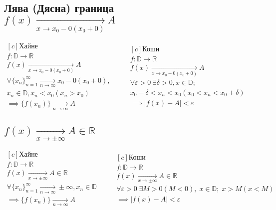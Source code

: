 \documentclass{article}
\newcommand{\pto}[2]{\xrightarrow[#1 \to #2]{}}
\newcommand{\xto}[1]{\pto{x}{#1}}
\newcommand{\nto}[0]{\pto{n}{\infty}}
\newcommand{\R}[0]{\mathbb{R}}
\newcommand{\D}[0]{\mathbb{D}}
\newcommand{\spc}[0]{\quad}
\newcommand{\e}[0]{\varepsilon}
\newcommand{\seq}[1]{\{#1_n\}_{n=1}^{\infty}}
\begin{document}
    \subsection{Лява (Дясна) граница \\ \(f(x) \xto{x_0 - 0 (x_0 + 0)} A\)}
    \(
        \begin{aligned}[c]
        \text{Хайне}\\
        f: \D \to \R\\
        f(x) \xto{x_0 - 0 (x_0 + 0)} A\\
        \forall \seq{x} \nto x_0 - 0 (x_0 + 0),\\
        x_n \in \D, x_n < x_0 (x_n > x_0)\\
        \implies \{f(x_n)\} \nto A 
        \end{aligned}
        \spc\spc
        \begin{aligned}[c]
         \text{Коши}\\
        f: \D \to \R\\
        f(x) \xto{x_0 - 0 (x_0 + 0)} A\\
        \forall \e > 0 \; \exists \delta > 0, x \in \D;\\
        x_0 - \delta < x_n < x_0 (x_0 < x_n < x_0 + \delta)\\
        \implies |f(x) - A| < \e
        \end{aligned}
    \)
    \subsection{\(f(x) \xto{\pm \infty} A \in \R\)}
    \(
        \begin{aligned}[c]
        \text{Хайне}\\
        f: \D \to \R\\
        f(x) \xto{\pm \infty} A \in \R\\
        \forall \seq{x} \nto \pm \infty, x_n \in \D\\
        \implies \{f(x_n)\} \nto A 
        \end{aligned}
        \spc\spc
        \begin{aligned}[c]
         \text{Коши}\\
        f: \D \to \R\\
        f(x) \xto{\pm \infty} A \in \R\\
        \forall \e > 0\; \exists M > 0 (M < 0), \; x \in \D; \; x > M (x < M)\\
        \implies |f(x) - A| < \e
        \end{aligned}
    \)
\end{document}
